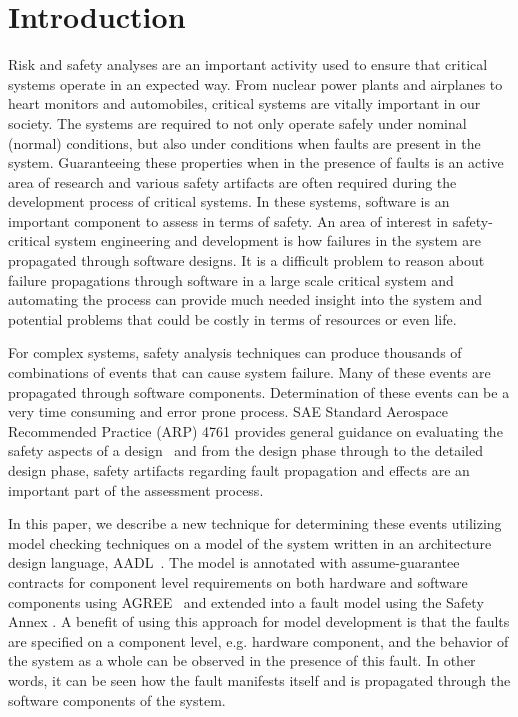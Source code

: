 \section{Introduction}
\label{sec:intro}

Risk and safety analyses are an important activity used to ensure that critical systems operate in an expected way. From nuclear power plants and airplanes to heart monitors and automobiles, critical systems are vitally important in our society. The systems are required to not only operate safely under nominal (normal) conditions, but also under conditions when faults are present in the system. Guaranteeing these properties when in the presence of faults is an active area of research and various safety artifacts are often required during the development process of critical systems. In these systems, software is an important component to assess in terms of safety. An area of interest in safety-critical system engineering and development is how failures in the system are propagated through software designs. It is a difficult problem to reason about failure propagations through software in a large scale critical system and automating the process can provide much needed insight into the system and potential problems that could be costly in terms of resources or even life. 


 For complex systems, safety analysis techniques can produce thousands of combinations of events that can cause system failure. Many of these events are propagated through software components. Determination of these events can be a very time consuming and error prone process. SAE Standard Aerospace Recommended Practice (ARP) 4761 provides general guidance on evaluating the safety aspects of a design~\cite{SAE:ARP4761} and from the design phase through to the detailed design phase, safety artifacts regarding fault propagation and effects are an important part of the assessment process. 

In this paper, we describe a new technique for determining these events utilizing model checking techniques on a model of the system written in an architecture design language, AADL~\cite{AADL_Standard}. The model is annotated with assume-guarantee contracts for component level requirements on both hardware and software components using AGREE~\cite{QFCS15:backes} and extended into a fault model using the Safety Annex \cite{Stewart17:IMBSA,SATechReport}. A benefit of using this approach for model development is that the faults are specified on a component level, e.g. hardware component, and the behavior of the system as a whole can be observed in the presence of this fault. In other words, it can be seen how the fault manifests itself and is propagated through the software components of the system. 

